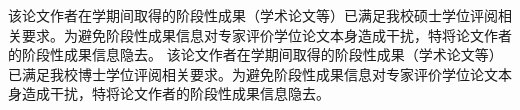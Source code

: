 \begin{resume}
\ifreview

\ifismaster
该论文作者在学期间取得的阶段性成果（学术论文等）已满足我校硕士学位评阅相关要求。为避免阶段性成果信息对专家评价学位论文本身造成干扰，特将论文作者的阶段性成果信息隐去。
\else
该论文作者在学期间取得的阶段性成果（学术论文等）已满足我校博士学位评阅相关要求。为避免阶段性成果信息对专家评价学位论文本身造成干扰，特将论文作者的阶段性成果信息隐去。
\fi

\else

\ifisresumebib

	\begin{refsection}
	\setcounter{gbnamefmtcase}{1}%
	\nocite{ref-1-1-Yang,ref-2-1-杨轶,ref-3-1-杨轶,ref-4-1-Yang,ref-5-1-Wu,ref-6-1-贾泽,ref-7-1-伍晓明}
	
	\setlength{\biblabelsep}{12pt}
	\printbibliography[env=resumebib,heading=subbibliography,title={发表的学术论文}] %

	\end{refsection}


	\begin{refsection}
	\setcounter{gbnamefmtcase}{1}%
	\nocite{ref-8-1-任天令,ref-9-1-Ren}%
	
	\setlength{\biblabelsep}{12pt}
	\printbibliography[env=resumebib,heading=subbibliography,title={研究成果}]

	\end{refsection}

\else

%
%
%
\fi
\fi
\end{resume}
